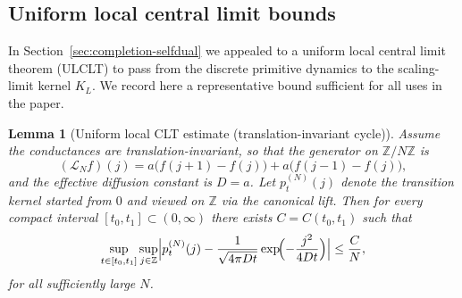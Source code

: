\documentclass[11pt]{amsart}
\newtheorem{lemma}[theorem]{Lemma}
\theoremstyle{definition}
\theoremstyle{remark}
\newcommand{\Z}{\mathbb{Z}}
\begin{document}
\subsection{Uniform local central limit bounds}
\label{app:ULCLT}

In Section~\ref{sec:completion-selfdual} we appealed to a uniform local central
limit theorem (ULCLT) to pass from the discrete primitive dynamics to the
scaling-limit kernel $K_L$. We record here a representative bound sufficient for
all uses in the paper.

\begin{lemma}[Uniform local CLT estimate (translation-invariant cycle)]
\label{lem:ULCLT}
Assume the conductances are translation-invariant, so that the generator on $\Z/N\Z$ is
\[
(\mathcal L_N f)(j)=a\bigl(f(j+1)-f(j)\bigr)+a\bigl(f(j-1)-f(j)\bigr),
\]
and the effective diffusion constant is $D=a$. Let $p_t^{(N)}(j)$ denote the transition
kernel started from $0$ and viewed on $\Z$ via the canonical lift. Then for every compact
interval $[t_0,t_1]\subset(0,\infty)$ there exists $C=C(t_0,t_1)$ such that
\[
\sup_{t\in[t_0,t_1]}\sup_{j\in\Z}
\Bigl|
p_t^{(N)}(j)
-
\frac{1}{\sqrt{4\pi Dt}}\exp\!\Bigl(-\frac{j^2}{4Dt}\Bigr)
\Bigr|
\le
\frac{C}{N},
\]
for all sufficiently large $N$.
\end{lemma}
\end{document}
